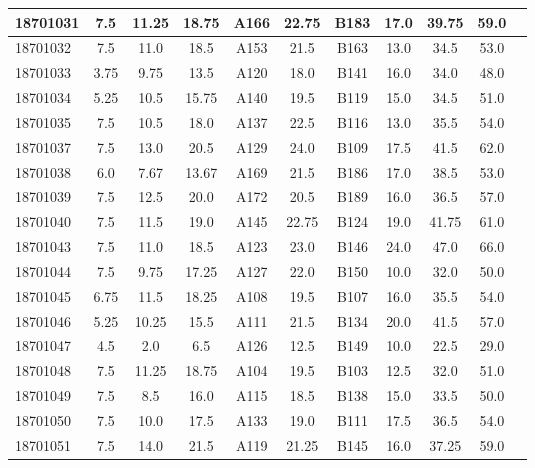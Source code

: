 \documentclass[12pt]{article}
\begin{document}
\begin{center}
\begin{small}
\begin{tabular}{|l|c|c|c|c|c|c|c|c|c|c|}
18701031 & 7.5 & 11.25 & 18.75 & A166 & 22.75 & B183 & 17.0 & 39.75 & 59.0\\ \hline 
18701032 & 7.5 & 11.0 & 18.5 & A153 & 21.5 & B163 & 13.0 & 34.5 & 53.0\\ \hline 
18701033 & 3.75 & 9.75 & 13.5 & A120 & 18.0 & B141 & 16.0 & 34.0 & 48.0\\ \hline 
18701034 & 5.25 & 10.5 & 15.75 & A140 & 19.5 & B119 & 15.0 & 34.5 & 51.0\\ \hline 
18701035 & 7.5 & 10.5 & 18.0 & A137 & 22.5 & B116 & 13.0 & 35.5 & 54.0\\ \hline 
18701037 & 7.5 & 13.0 & 20.5 & A129 & 24.0 & B109 & 17.5 & 41.5 & 62.0\\ \hline 
18701038 & 6.0 & 7.67 & 13.67 & A169 & 21.5 & B186 & 17.0 & 38.5 & 53.0\\ \hline 
18701039 & 7.5 & 12.5 & 20.0 & A172 & 20.5 & B189 & 16.0 & 36.5 & 57.0\\ \hline 
18701040 & 7.5 & 11.5 & 19.0 & A145 & 22.75 & B124 & 19.0 & 41.75 & 61.0\\ \hline 
18701043 & 7.5 & 11.0 & 18.5 & A123 & 23.0 & B146 & 24.0 & 47.0 & 66.0\\ \hline 
18701044 & 7.5 & 9.75 & 17.25 & A127 & 22.0 & B150 & 10.0 & 32.0 & 50.0\\ \hline 
18701045 & 6.75 & 11.5 & 18.25 & A108 & 19.5 & B107 & 16.0 & 35.5 & 54.0\\ \hline 
18701046 & 5.25 & 10.25 & 15.5 & A111 & 21.5 & B134 & 20.0 & 41.5 & 57.0\\ \hline 
18701047 & 4.5 & 2.0 & 6.5 & A126 & 12.5 & B149 & 10.0 & 22.5 & 29.0\\ \hline 
18701048 & 7.5 & 11.25 & 18.75 & A104 & 19.5 & B103 & 12.5 & 32.0 & 51.0\\ \hline 
18701049 & 7.5 & 8.5 & 16.0 & A115 & 18.5 & B138 & 15.0 & 33.5 & 50.0\\ \hline 
18701050 & 7.5 & 10.0 & 17.5 & A133 & 19.0 & B111 & 17.5 & 36.5 & 54.0\\ \hline 
18701051 & 7.5 & 14.0 & 21.5 & A119 & 21.25 & B145 & 16.0 & 37.25 & 59.0\\ \hline 
        \end{tabular}
            \end{small}
            \end{center}
  \centering
            
\end{document}

